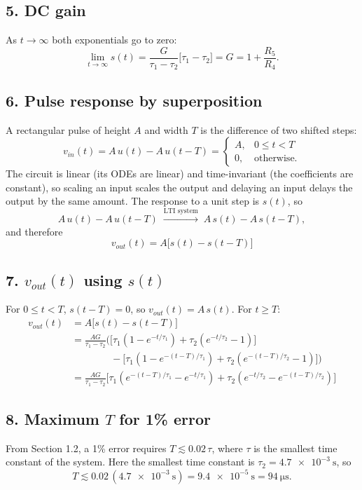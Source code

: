 \documentclass[12pt]{article}
\begin{document}
\subsection*{5. DC gain}
As $t \to \infty$ both exponentials go to zero:
\[
\lim_{t\to\infty}s(t) = \frac{G}{\tau_1 - \tau_2}\big[\tau_1 - \tau_2\big] = G = 1 + \frac{R_5}{R_4}.
\]

\subsection*{6. Pulse response by superposition}
A rectangular pulse of height $A$ and width $T$ is the difference of two shifted steps:
\[
v_{in}(t) = A\,u(t) - A\,u(t-T) =
\begin{cases}
A, & 0 \le t < T \\
0, & \text{otherwise.}
\end{cases}
\]
The circuit is linear (its ODEs are linear) and time-invariant (the coefficients are constant), so scaling an input scales the output and delaying an input delays the output by the same amount. The response to a unit step is $s(t)$, so
\[
A\,u(t) - A\,u(t-T) \;\xrightarrow{\text{LTI system}}\; A\,s(t) - A\,s(t-T),
\]
and therefore
\[
\boxed{v_{out}(t) = A\big[s(t) - s(t-T)\big]}
\]

\subsection*{7. $v_{out}(t)$ using $s(t)$}
For $0 \le t < T$, $s(t-T) = 0$, so $v_{out}(t) = A\,s(t)$. For $t \ge T$:
\begin{align*}
v_{out}(t) &= A\big[s(t) - s(t-T)\big] \\
&= \frac{AG}{\tau_1 - \tau_2}\Big(\big[\tau_1(1 - e^{-t/\tau_1}) + \tau_2(e^{-t/\tau_2} - 1)\big] \\
&\qquad\qquad - \big[\tau_1(1 - e^{-(t-T)/\tau_1}) + \tau_2(e^{-(t-T)/\tau_2} - 1)\big]\Big) \\
&= \frac{AG}{\tau_1 - \tau_2}\Big[\tau_1\left(e^{-(t-T)/\tau_1} - e^{-t/\tau_1}\right) + \tau_2\left(e^{-t/\tau_2} - e^{-(t-T)/\tau_2}\right)\Big]
\end{align*}

\subsection*{8. Maximum $T$ for 1\% error}
From Section 1.2, a 1\% error requires $T \lesssim 0.02\,\tau$, where $\tau$ is the smallest time constant of the system. Here the smallest time constant is $\tau_2 = \SI{4.7e-3}{\second}$, so
\[
T \lesssim 0.02\,(\SI{4.7e-3}{\second}) = \SI{9.4e-5}{\second} = \SI{94}{\micro\second}.
\]
\end{document}
